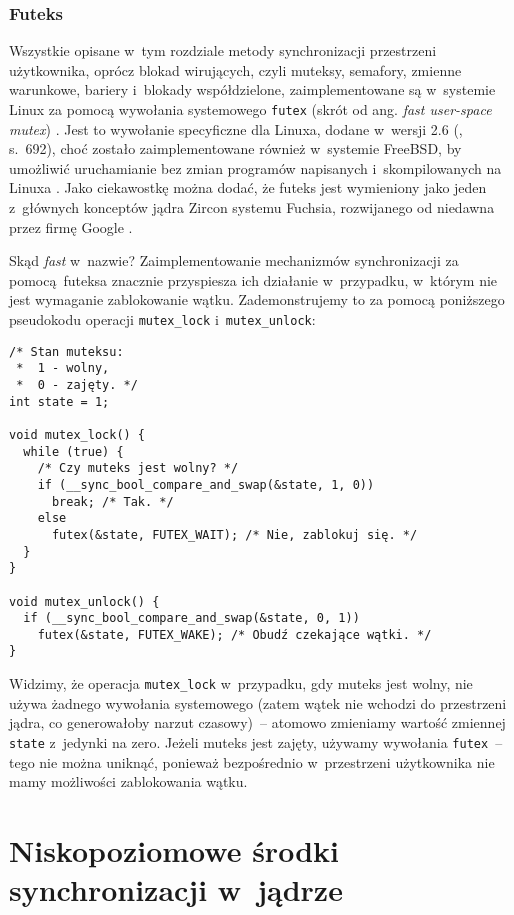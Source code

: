 \documentclass[shortabstract]{iithesis}
\theoremstyle{definition} \newtheorem*{definition}{Definicja}
\theoremstyle{definition} \newtheorem*{example}{Przykład}
\theoremstyle{definition} \newtheorem*{remark}{Uwaga}
\begin{document}
\subsection{Futeks}

Wszystkie opisane w~tym rozdziale metody synchronizacji przestrzeni użytkownika, oprócz blokad wirujących, czyli
muteksy, semafory, zmienne warunkowe, bariery i~blokady współdzielone, zaimplementowane są w~systemie Linux
za pomocą wywołania systemowego \texttt{futex} (skrót od ang. \textit{fast user-space mutex}) \cite{man:futex}.
Jest to wywołanie specyficzne dla Linuxa, dodane w~wersji 2.6 (\cite{bib:lpi}, s.~692),
choć zostało zaimplementowane również w~systemie FreeBSD,
by umożliwić uruchamianie bez zmian programów napisanych i~skompilowanych na Linuxa \cite{bib:freebsd-doc:linuxemu}.
Jako ciekawostkę można dodać, że futeks jest wymieniony jako jeden z~głównych konceptów jądra Zircon
systemu Fuchsia, rozwijanego od niedawna przez firmę Google \cite{zircon:futex}.

Skąd \textit{fast} w~nazwie? Zaimplementowanie mechanizmów synchronizacji za pomocą futeksa znacznie przyspiesza ich
działanie w~przypadku, w~którym nie jest wymaganie zablokowanie wątku. Zademonstrujemy to za pomocą poniższego
pseudokodu operacji \texttt{mutex\_lock} i~\texttt{mutex\_unlock}:

\begin{lstlisting}
/* Stan muteksu:
 *  1 - wolny,
 *  0 - zajęty. */
int state = 1;

void mutex_lock() {
  while (true) {
    /* Czy muteks jest wolny? */
    if (__sync_bool_compare_and_swap(&state, 1, 0))
      break; /* Tak. */
    else
      futex(&state, FUTEX_WAIT); /* Nie, zablokuj się. */
  }
}

void mutex_unlock() {
  if (__sync_bool_compare_and_swap(&state, 0, 1))
    futex(&state, FUTEX_WAKE); /* Obudź czekające wątki. */
}
\end{lstlisting}

Widzimy, że operacja \texttt{mutex\_lock} w~przypadku, gdy muteks jest wolny,
nie używa żadnego wywołania systemowego (zatem wątek nie wchodzi do przestrzeni jądra, co generowałoby
narzut czasowy)~-- atomowo zmieniamy wartość zmiennej \texttt{state} z~jedynki
na zero. Jeżeli muteks jest zajęty, używamy wywołania \texttt{futex}~-- tego nie można uniknąć, ponieważ
bezpośrednio w~przestrzeni użytkownika nie mamy możliwości zablokowania wątku.

\chapter{Niskopoziomowe środki synchronizacji w~jądrze}
\label{chap:3}
\end{document}
